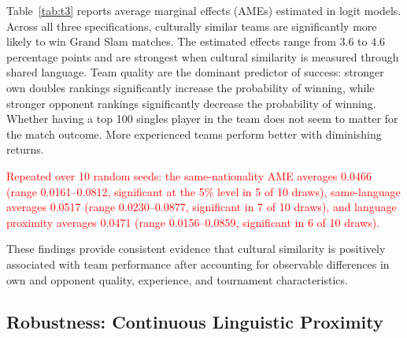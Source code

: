 \documentclass[10pt]{article}
\begin{document}
Table~\ref{tab:t3} reports average marginal effects (AMEs) estimated in logit models. %
Across all three specifications, culturally similar teams are significantly more likely to win Grand Slam matches. The estimated effects range from 3.6 to 4.6 percentage points and are strongest when cultural similarity is measured through shared language. Team quality are the dominant predictor of success: stronger own doubles rankings significantly increase the probability of winning, while stronger opponent rankings significantly decrease the probability of winning. Whether having a top 100 singles player in the team does not seem to matter for the match outcome. More experienced teams perform better with diminishing returns.

 \textcolor{red}{Repeated over 10 random seeds: the same-nationality AME averages 0.0466 (range 0.0161--0.0812, significant at the 5\% level in 5 of 10 draws), same-language averages 0.0517 (range 0.0230--0.0877, significant in 7 of 10 draws), and language proximity averages 0.0471 (range 0.0156--0.0859, significant in 6 of 10 draws).}

These findings provide consistent evidence that cultural similarity is positively associated with team performance after accounting for observable differences in own and opponent quality,  experience, and tournament characteristics.

\subsection{Robustness: Continuous Linguistic Proximity}

\end{document}
